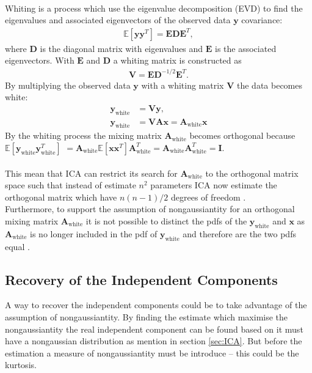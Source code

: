 \\
Whiting is a process which use the eigenvalue decomposition (EVD) to find the eigenvalues and associated eigenvectors of the observed data $\mathbf{y}$ covariance:
\begin{align*}
\mathbb{E}[\mathbf{yy}^T] = \mathbf{EDE}^T,
\end{align*}
where $\mathbf{D}$ is the diagonal matrix with eigenvalues and $\mathbf{E}$ is the associated eigenvectors. With $\mathbf{E}$ and $\mathbf{D}$ a whiting matrix is constructed as
\begin{align*}
\mathbf{V} = \mathbf{ED}^{-1/2} \mathbf{E}^T.
\end{align*}
By multiplying the observed data $\mathbf{y}$ with a whiting matrix $\mathbf{V}$ the data becomes white:
\begin{align}
\mathbf{y}_{\text{white}} &= \mathbf{Vy}, \\
\mathbf{y}_{\text{white}} &= \mathbf{VAx} = \mathbf{A}_{\text{white}} \mathbf{x} \nonumber
\end{align}
By the whiting process the mixing matrix $\mathbf{A}_{\text{white}}$ becomes orthogonal because $\mathbb{E}[\mathbf{y}_{\text{white}} \mathbf{y}_{\text{white}}^T]$ $= \mathbf{A}_{\text{white}} \mathbb{E}[\mathbf{xx}^T] \mathbf{A}_{\text{white}}^T = \mathbf{A}_{\text{white}} \mathbf{A}_{\text{white}}^T = \mathbf{I}$. 
\\ \\
This mean that ICA can restrict its search for $\mathbf{A}_{\text{white}}$ to the orthogonal matrix space such that instead of estimate $n^2$ parameters ICA now estimate the orthogonal matrix which have $n(n-1)/2$ degrees of freedom \cite[p. 159]{ICA}.
\\
Furthermore, to support the assumption of nongaussiantity for an orthogonal mixing matrix $\mathbf{A}_{\text{white}}$ it is not possible to distinct the pdfs of the $\mathbf{y}_{\text{white}}$ and $\mathbf{x}$ as $\mathbf{A}_{\text{white}}$ is no longer included in the pdf of $\mathbf{y}_{\text{white}}$ and therefore are the two pdfs equal \cite[p. 161-163]{ICA}.

\subsection{Recovery of the Independent Components}\label{sec:est_ica}
A way to recover the independent components could be to take advantage of the assumption of nongaussiantity. By finding the estimate which maximise the nongaussiantity the real independent component can be found based on it must have a nongaussian distribution as mention in section \ref{sec:ICA}. But before the estimation a measure of nongaussiantity must be introduce -- this could be the kurtosis.

